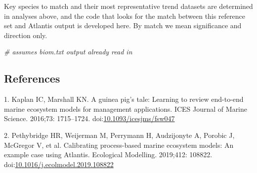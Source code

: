 \documentclass[
]{article}
\newenvironment{Shaded}{\begin{snugshade}}{\end{snugshade}}
\newcommand{\CommentTok}[1]{\textcolor[rgb]{0.56,0.35,0.01}{\textit{#1}}}
\begin{document}
Key species to match and their most representative trend datasets are
determined in analyses above, and the code that looks for the match
between this reference set and Atlantis output is developed here. By
match we mean significance and direction only.

\begin{Shaded}
\begin{Highlighting}[]
\CommentTok{# assumes biom.txt output already read in}
\end{Highlighting}
\end{Shaded}

\hypertarget{references}{%
\subsection*{References}\label{references}}

\hypertarget{refs}{}
\leavevmode\hypertarget{ref-kaplan_guinea_2016}{}%
1. Kaplan IC, Marshall KN. A guinea pig's tale: Learning to review
end-to-end marine ecosystem models for management applications. ICES
Journal of Marine Science. 2016;73: 1715--1724.
doi:\href{https://doi.org/10.1093/icesjms/fsw047}{10.1093/icesjms/fsw047}

\leavevmode\hypertarget{ref-pethybridge_calibrating_2019}{}%
2. Pethybridge HR, Weijerman M, Perrymann H, Audzijonyte A, Porobic J,
McGregor V, et al. Calibrating process-based marine ecosystem models: An
example case using Atlantis. Ecological Modelling. 2019;412: 108822.
doi:\href{https://doi.org/10.1016/j.ecolmodel.2019.108822}{10.1016/j.ecolmodel.2019.108822}
\end{document}
